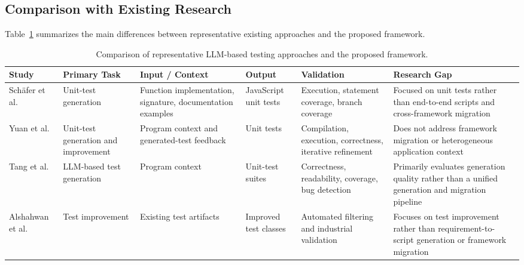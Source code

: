 \documentclass[pdflatex,sn-mathphys-num]{sn-jnl}
\begin{document}
\subsection{Comparison with Existing Research}
\label{subsec:comparison}

Table~\ref{tab:related-work-comparison} summarizes the main differences
between representative existing approaches and the proposed framework.

\begin{table}[ht]
\centering
\caption{Comparison of representative LLM-based testing approaches and
the proposed framework.}
\label{tab:related-work-comparison}
\small
\begin{tabularx}{\textwidth}{
    >{\raggedright\arraybackslash}p{1.4cm}
    >{\raggedright\arraybackslash}p{1.4cm}
    >{\raggedright\arraybackslash}p{2.0cm}
    >{\raggedright\arraybackslash}p{1.4cm}
    >{\raggedright\arraybackslash}p{2.0cm}
    >{\raggedright\arraybackslash}p{3.0cm}
}
\toprule
\textbf{Study} &
\textbf{Primary Task} &
\textbf{Input / Context} &
\textbf{Output} &
\textbf{Validation} &
\textbf{Research Gap} \\
\midrule

Schäfer et al.~\cite{schafer2024testpilot}
&
Unit-test generation
&
Function implementation, signature, documentation examples
&
JavaScript unit tests
&
Execution, statement coverage, branch coverage
&
Focused on unit tests rather than end-to-end scripts and cross-framework migration
\\

Yuan et al.~\cite{yuan2024chatgpt}
&
Unit-test generation and improvement
&
Program context and generated-test feedback
&
Unit tests
&
Compilation, execution, correctness, iterative refinement
&
Does not address framework migration or heterogeneous application context
\\

Tang et al.~\cite{tang2024chatgpt}
&
LLM-based test generation
&
Program context
&
Unit-test suites
&
Correctness, readability, coverage, bug detection
&
Primarily evaluates generation quality rather than a unified generation and migration pipeline
\\

Alshahwan et al.~\cite{alshahwan2024testgenllm}
&
Test improvement
&
Existing test artifacts
&
Improved test classes
&
Automated filtering and industrial validation
&
Focuses on test improvement rather than requirement-to-script generation or framework migration
\\


\end{tabularx}
\end{table}
\end{document}
